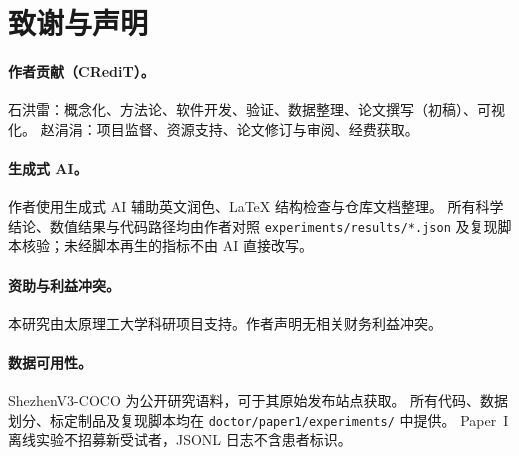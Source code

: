 \section*{致谢与声明}

\paragraph{作者贡献（CRediT）。}
石洪雷：概念化、方法论、软件开发、验证、数据整理、论文撰写（初稿）、可视化。
赵涓涓：项目监督、资源支持、论文修订与审阅、经费获取。

\paragraph{生成式 AI。}
作者使用生成式 AI 辅助英文润色、\LaTeX{} 结构检查与仓库文档整理。
所有科学结论、数值结果与代码路径均由作者对照 \texttt{experiments/results/*.json} 及复现脚本核验；未经脚本再生的指标不由 AI 直接改写。

\paragraph{资助与利益冲突。}
本研究由太原理工大学科研项目支持。作者声明无相关财务利益冲突。

\paragraph{数据可用性。}
ShezhenV3-COCO 为公开研究语料，可于其原始发布站点获取。
所有代码、数据划分、标定制品及复现脚本均在 \texttt{doctor/paper1/experiments/} 中提供。
Paper~I 离线实验不招募新受试者，JSONL 日志不含患者标识。
